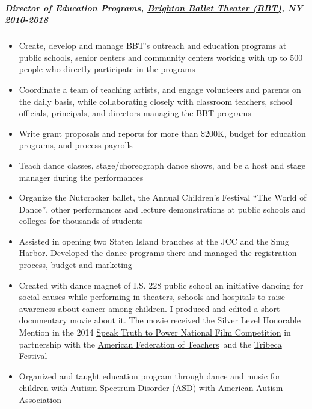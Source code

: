 \documentclass[
  letterpaper,
  DIV=11,
  numbers=noendperiod]{scrartcl}
\let\oldsubparagraph\subparagraph
\renewcommand{\subparagraph}[1]{\oldsubparagraph{#1}\mbox{}}
\providecommand{\tightlist}{%
  \setlength{\itemsep}{0pt}\setlength{\parskip}{0pt}}\usepackage{longtable,booktabs,array}
\begin{document}
\subparagraph{\texorpdfstring{{Director of Education Programs},
\href{https://www.brightonballet.org/}{Brighton Ballet Theater (BBT)},
NY
{2010-2018}}{Director of Education Programs, Brighton Ballet Theater (BBT), NY 2010-2018}}\label{director-of-education-programs-brighton-ballet-theater-bbt-ny-2010-2018}

\begin{itemize}
\tightlist
\item
  Create, develop and manage BBT's outreach and education programs at
  public schools, senior centers and community centers working with up
  to 500 people who directly participate in the programs
\item
  Coordinate a team of teaching artists, and engage volunteers and
  parents on the daily basis, while collaborating closely with classroom
  teachers, school officials, principals, and directors managing the BBT
  programs
\item
  Write grant proposals and reports for more than \$200K, budget for
  education programs, and process payrolls
\item
  Teach dance classes, stage/choreograph dance shows, and be a host and
  stage manager during the performances
\item
  Organize the Nutcracker ballet, the Annual Children's Festival ``The
  World of Dance'', other performances and lecture demonstrations at
  public schools and colleges for thousands of students
\item
  Assisted in opening two Staten Island branches at the JCC and the Snug
  Harbor. Developed the dance programs there and managed the
  registration process, budget and marketing
\item
  Created with dance magnet of I.S. 228 public school an initiative
  dancing for social causes while performing in theaters, schools and
  hospitals to raise awareness about cancer among children. I produced
  and edited a short documentary movie about it. The movie received the
  Silver Level Honorable Mention in the 2014
  \href{https://rfkhumanrights.org/our-impact/education/educators/speak-truth-to-power-video-contest/}{Speak
  Truth to Power National Film Competition} in partnership with the
  \hyperref[0]{American Federation of Teachers}~and the
  \hyperref[0]{Tribeca Festival}
\item
  Organized and taught education program through dance and music for
  children with
  \href{https://www.nydailynews.com/2012/10/17/autistic-kids-learn-through-dance-thanks-to-brighton-ballet-theaters-founder-irina-roizin/}{Autism
  Spectrum Disorder (ASD) with American Autism Association}
\end{itemize}
\end{document}
